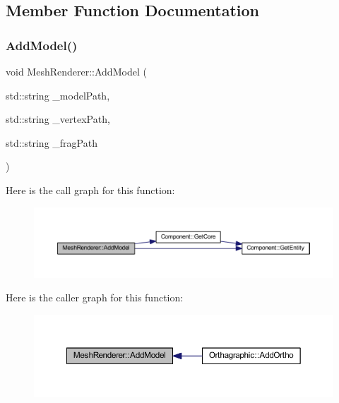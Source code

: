 \subsection{Member Function Documentation}
\mbox{\label{class_mesh_renderer_a90798e723067ca8c721f0c96c1609972}} 
\subsubsection{\texorpdfstring{Add\+Model()}{AddModel()}}
{\footnotesize\ttfamily void Mesh\+Renderer\+::\+Add\+Model (\begin{DoxyParamCaption}\item[{std\+::string}]{\+\_\+model\+Path,  }\item[{std\+::string}]{\+\_\+vertex\+Path,  }\item[{std\+::string}]{\+\_\+frag\+Path }\end{DoxyParamCaption})}

Here is the call graph for this function\+:
\nopagebreak
\begin{figure}[H]
\begin{center}
\leavevmode
\includegraphics[width=350pt]{class_mesh_renderer_a90798e723067ca8c721f0c96c1609972_cgraph}
\end{center}
\end{figure}
Here is the caller graph for this function\+:
\nopagebreak
\begin{figure}[H]
\begin{center}
\leavevmode
\includegraphics[width=350pt]{class_mesh_renderer_a90798e723067ca8c721f0c96c1609972_icgraph}
\end{center}
\end{figure}
\mbox{\label{class_mesh_renderer_a3fc0e9658d3b9a53e3559cb9b939aeb9}} 
